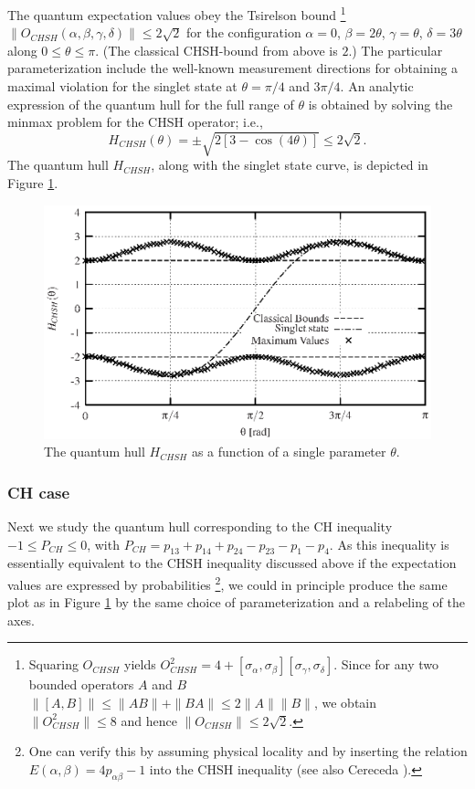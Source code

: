 The quantum expectation values
obey the Tsirelson bound
\footnote{Squaring $O_{CHSH}$ yields  \cite[p. 174]{peres}
$
  O_{CHSH}^2=4+[\sigma_\alpha,\sigma_\beta][\sigma_\gamma,\sigma_\delta]
$.
Since  for any two bounded
operators $A$ and $B$
$
  \|[A,B]\| \leq \|A B\| + \|B A\| \leq 2\|A\|\|B\|
$,
we obtain $\| O_{CHSH}^2 \| \leq 8$ and hence
$  \|O_{CHSH}\| \leq 2\sqrt{2}$.
}
$ \|O_{CHSH}(\alpha ,\beta ,\gamma ,\delta ) \|  \leq 2\sqrt{2}$
for the configuration
$\alpha=0$,
$\beta=2\theta$,
$\gamma=\theta$,
$\delta=3\theta$ along $0 \le \theta \le \pi$.
(The classical CHSH-bound from above is $2$.)
The
particular parameterization include the well-known
measurement directions for obtaining a maximal violation for the
singlet state at $\theta=\pi/4$ and $3\pi/4$.
An analytic expression of the quantum hull for the full
range of $\theta$ is obtained by solving the minmax
problem \cite[\S 90]{halmos-vs} for the CHSH operator; i.e.,
\begin{equation}
H_{CHSH}(\theta )=\pm \sqrt{2[3-\cos (4\theta )]} \le 2\sqrt{2}
.
\end{equation}
The quantum hull $H_{CHSH}$, along
with the singlet state curve, is depicted in Figure \ref{f-2003-qpoly-2}.
\begin{figure}[!ht]
  \centering
  \includegraphics{2003-qpoly-plotchsh}
  \caption{The quantum hull $H_{CHSH}$
as a function of a single parameter $\theta$.}
  \label{f-2003-qpoly-2}
\end{figure}


\subsubsection{CH case}
Next we  study the quantum hull corresponding to the CH inequality
$ -1\le P_{CH} \leq 0$,
with $
P_{CH} = p_{13} + p_{14} + p_{24} - p_{23} - p_{1} - p_{4}
$.
As this inequality is essentially equivalent to the CHSH inequality
discussed above if the expectation values are expressed by probabilities
\footnote{One can  verify this by assuming physical locality \cite{mermin-1995}
and by inserting the
  relation $E(\alpha,\beta) = 4p_{\alpha\beta} - 1$ into the CHSH
  inequality (see also Cereceda \cite{cereceda-2001}).}, we could in principle produce the same plot as in Figure
\ref{f-2003-qpoly-2} by the same choice of parameterization and a
relabeling of the axes.

